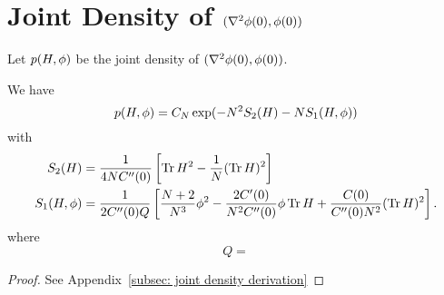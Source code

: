 \section{Joint Density of \((\nabla^2\phi(0), \phi(0))\)}

Let \(p(H, \phi)\) be the joint density of \((\nabla^2\phi(0), \phi(0))\). 

\begin{lemma}\label{lem: joint density}
	We have
	\[
		p(H, \phi) = C_N \exp(-N^2 S_2(H) - N S_1(H, \phi))
	\]
	with
	\begin{align*}
		S_2(H)
		&= \frac{1}{4NC''(0)}\left[
			\operatorname{Tr} H^2 - \frac1{N}(\operatorname{Tr} H)^2
		\right]
		\\
		S_1(H,\phi)
		&= \frac1{2C''(0)Q}\left[
			\frac{N+2}{N^3}\phi^2
			- \frac{2C'(0)}{N^2C''(0)}\phi\operatorname{Tr} H
			+ \frac{C(0)}{C''(0)N^2}(\operatorname{Tr} H)^2
		\right].
	\end{align*}
	where
	\[
		Q = 
	\]
\end{lemma}
\begin{proof}
	See Appendix~\ref{subsec: joint density derivation}
\end{proof}